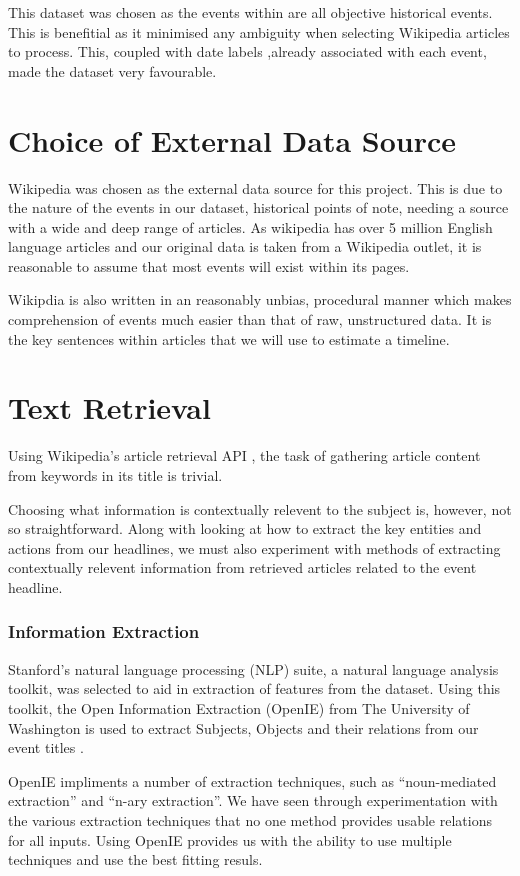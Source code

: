 \documentclass[bsc,frontabs,twoside,singlespacing,parskip,deptreport]{infthesis}     %
\begin{document}
This dataset was chosen as the events within are all objective historical events. This is benefitial as it minimised
any ambiguity when selecting Wikipedia articles to process. This, coupled with date labels ,already associated with
each event, made the dataset very favourable.


\section{Choice of External Data Source}
Wikipedia was chosen as the external data source for this project.
This is due to the nature of the events in our dataset, historical points of note,
needing a source with a wide and deep range of articles.
As wikipedia has over 5 million English language articles \cite{wikipedaisize} and our original data
is taken from a Wikipedia outlet, it is reasonable to assume
that most events will exist within its pages.


Wikipdia is also written in an reasonably unbias, procedural manner which makes comprehension of events much
easier than that of raw, unstructured data.
It is the key sentences within articles that we will use to estimate a timeline.

\section{Text Retrieval}
Using Wikipedia's article retrieval API \cite{wikipediaAPI}, the task of gathering article content
from keywords in its title is trivial.

Choosing what information is contextually relevent to the subject is, however, not so straightforward.
Along with looking at how to extract the key entities and actions from our 
headlines, we must also experiment with methods of extracting contextually relevent information from
retrieved articles related to the event headline.

\subsubsection{Information Extraction}
Stanford's natural language processing (NLP) suite,
a natural language analysis toolkit,
was selected to aid in extraction of features from the dataset.
Using this toolkit, the Open Information Extraction (OpenIE) from
The University of Washington is used to extract Subjects, Objects
and their relations from our event titles \cite{schmitz2012open}.


OpenIE impliments a number of extraction techniques, such as ``noun-mediated extraction'' and ``n-ary extraction''.
We have seen through experimentation with the various extraction techniques that no one method provides
usable relations for all inputs. Using OpenIE provides us with the ability to use multiple techniques and
use the best fitting resuls.
\end{document}

